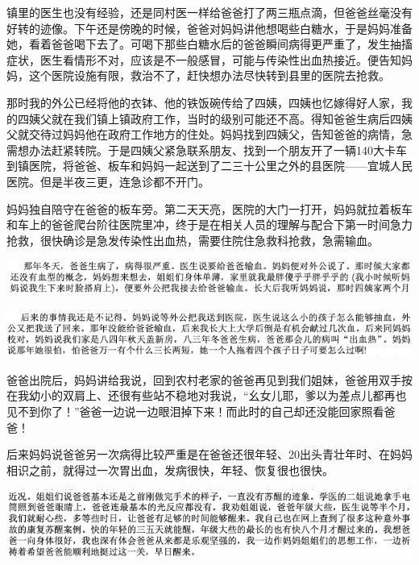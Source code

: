 \documentclass[9pt, b5paper]{article}
\begin{document}
镇里的医生也没有经验，还是同村医一样给爸爸打了两三瓶点滴，但爸爸丝毫没有好转的迹像。下午还是傍晚的时候，爸爸对妈妈讲他想喝些白糖水，于是妈妈准备她，看着爸爸喝下去了。可喝下那些白糖水后的爸爸瞬间病得更严重了，发生抽搐症状，医生看情形不对，应该是不一般感冒，可能与传染性出血热接近。便告知妈妈，这个医院设施有限，救治不了，赶快想办法尽快转到县里的医院去抢救。

那时我的外公已经将他的衣钵、他的铁饭碗传给了四姨，四姨也忆嫁得好人家，我的四姨父就在我们镇上镇政府工作，当时的级别可能还不高。得知爸爸生病后四姨父就交待过妈妈他在政府工作地方的住处。妈妈找到四姨父，告知爸爸的病情，急需想办法赶紧转院。于是四姨父紧急联系朋友、找到一个朋友开了一辆140大卡车到镇医院，将爸爸、板车和妈妈一起送到了二三十公里之外的县医院——宜城人民医院。但是半夜三更，连急诊都不开门。 

妈妈独自陪守在爸爸的板车旁。第二天天亮，医院的大门一打开，妈妈就拉着板车和车上的爸爸爬台阶往医院里冲，终于是在相关人员的理解与配合下第一时间急力抢救，很快确诊是急发传染性出血热，需要住院住急救科抢救，急需输血。

\begin{center}
\includegraphics[width=.9\linewidth]{./pic/backups_plans_20210417_104907.png}
\end{center}

\begin{center}
\includegraphics[width=.9\linewidth]{./pic/backups_plans_20210417_104955.png}
\end{center}

爸爸出院后，妈妈讲给我说，回到农村老家的爸爸再见到我们姐妹，爸爸用双手按在我幼小的双肩上、还很有些站不稳地对我说，“幺女儿耶，爹以为差点儿都再也见不到你了！”爸爸一边说一边眼泪掉下来！而此时的自己却还没能回家照看爸爸！

后来妈妈说爸爸另一次病得比较严重是在爸爸还很年轻、20出头青壮年时、在妈妈相识之前，就得过一次胃出血，发病很快，年轻、恢复很也很快。 

\begin{center}
\includegraphics[width=.9\linewidth]{./pic/backups_plans_20210416_161016.png}
\end{center}
\end{document}
